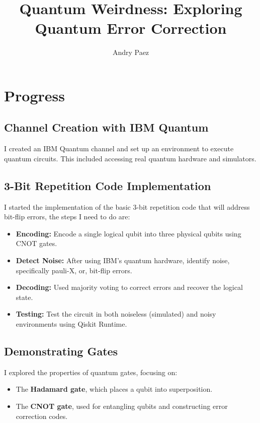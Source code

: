 \documentclass{article}
\begin{document}
\newcommand{\ket}[1]{\left| #1 \right>}

\title{Quantum Weirdness: Exploring Quantum Error Correction}
\author{Andry Paez}
\date{}
\maketitle

\section*{Progress}

\subsection*{Channel Creation with IBM Quantum}
I created an IBM Quantum channel and set up an environment to execute quantum circuits. This included accessing real quantum hardware and simulators.

\subsection*{3-Bit Repetition Code Implementation}
I started the implementation of the basic 3-bit repetition code that will address bit-flip errors, the steps I need to do are:
\begin{itemize}
    \item \textbf{Encoding:} Encode a single logical qubit into three physical qubits using CNOT gates.
    \item \textbf{Detect Noise:} After using IBM's quantum hardware, identify noise, specifically pauli-X, or, bit-flip errors.
    \item \textbf{Decoding:} Used majority voting to correct errors and recover the logical state.
    \item \textbf{Testing:} Test the circuit in both noiseless (simulated) and noisy environments using Qiskit Runtime.
\end{itemize}

\subsection*{Demonstrating Gates}
I explored the properties of quantum gates, focusing on:
\begin{itemize}
    \item The \textbf{Hadamard gate}, which places a qubit into superposition.
    \item The \textbf{CNOT gate}, used for entangling qubits and constructing error correction codes.
\end{itemize}
\end{document}
